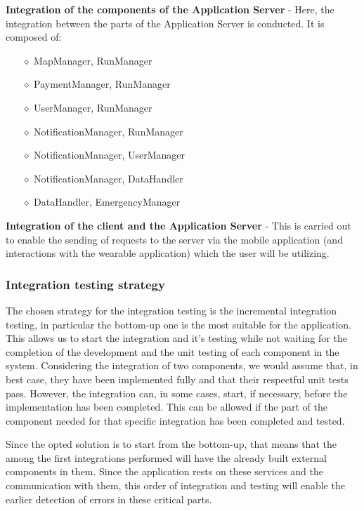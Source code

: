 \textbf{Integration of the components of the Application Server} - Here, the integration between the parts of the Application Server is conducted. It is composed of:
\begin{itemize}
\item[$\diamond$] MapManager, RunManager
\item[$\diamond$] PaymentManager, RunManager
\item[$\diamond$] UserManager, RunManager
\item[$\diamond$] NotificationManager, RunManager
\item[$\diamond$] NotificationManager, UserManager
\item[$\diamond$] NotificationManager, DataHandler
\item[$\diamond$] DataHandler, EmergencyManager
\end{itemize}

\textbf{Integration of the client and the Application Server} - This is carried out to enable the sending of requests to the server via the mobile application (and interactions with the wearable application) which the user will be utilizing.

\subsubsection{Integration testing strategy}
The chosen strategy for the integration testing is the incremental integration testing, in particular the bottom-up one is the most suitable for the application. This allows us to start the integration and it’s testing while not waiting for the completion of the development and the unit testing of each component in the system. Considering the integration of two components, we would assume that, in best case, they have been implemented fully and that their respectful unit tests pass. However, the integration can, in some cases, start, if necessary, before the implementation has been completed. This can be allowed if the part of the component needed for that specific integration has been completed and tested. \newline

Since the opted solution is to start from the bottom-up, that means that the among the first integrations performed will have the already built external components in them. Since the application rests on these services and the communication with them, this order of integration and testing will enable the earlier detection of errors in these critical parts. \newline


